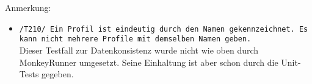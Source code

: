 Anmerkung:
\begin{itemize}
\item \texttt{/T210/ Ein Profil ist eindeutig durch den Namen gekennzeichnet. Es kann nicht mehrere Profile mit demselben Namen geben.}\\ 
	Dieser Testfall zur Datenkonsistenz wurde nicht wie oben durch MonkeyRunner umgesetzt. Seine Einhaltung ist aber schon durch die Unit-Tests gegeben.
\end{itemize}
